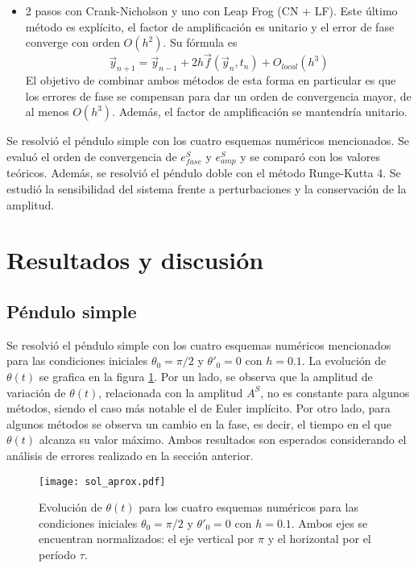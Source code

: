 \documentclass[aps,prb,twocolumn,superscriptaddress,floatfix,longbibliography,10pt]{revtex4-2}
\newif\ifptitle
\newif\ifpnumber
\newcounter{para}
\newcommand\ptitle[1]{\par\refstepcounter{para}
{\ifpnumber{\noindent\textcolor{lightgray}{\textbf{\thepara}}\indent}\fi}
{\ifptitle{\textbf{[{#1}]}}\fi}}
\begin{document}
\begin{itemize}
  \item 2 pasos con Crank-Nicholson y uno con Leap Frog (CN + LF). Este último método es explícito, el factor de amplificación es unitario y el error de fase converge con orden $O(h^2)$. Su fórmula es
  \begin{equation}
    \nonumber \vec{y}_{n+1} = \vec{y}_{n-1} + 2 h \vec{f}(\vec{y}_n, t_n) + O_{local}(h^3)
    \label{eq:Leap_Frog}
  \end{equation}
  El objetivo de combinar ambos métodos de esta forma en particular es que los errores de fase se compensan para dar un orden de convergencia mayor, de al menos $O(h^3)$. Además, el factor de amplificación se mantendría unitario.


\end{itemize}

\ptitle{Resumen de lo que se hará. Qué se resuelve con qué}
Se resolvió el péndulo simple con los cuatro esquemas numéricos mencionados. Se evaluó el orden de convergencia de $e^S_{fase}$ y $e^S_{amp}$ y se comparó con los valores teóricos. Además, se resolvió el péndulo doble con el método Runge-Kutta 4. Se estudió la sensibilidad del sistema frente a perturbaciones y la conservación de la amplitud.





\section{Resultados y discusión}

\subsection{Péndulo simple}

Se resolvió el péndulo simple con los cuatro esquemas numéricos mencionados para las condiciones iniciales $\theta_0 = \pi/2$ y $\theta'_0 = 0$ con $h = 0.1$. La evolución de $\theta(t)$ se grafica en la figura \ref{fig:sol_aprox}. Por un lado, se observa que la amplitud de variación de $\theta(t)$, relacionada con la amplitud $A^S$, no es constante para algunos métodos, siendo el caso más notable el de Euler implícito. Por otro lado, para algunos métodos se observa un cambio en la fase, es decir, el tiempo en el que $\theta(t)$ alcanza su valor máximo. Ambos resultados son esperados considerando el análisis de errores realizado en la sección anterior.


\begin{figure}[h]
  \texttt{[image: sol\_aprox.pdf]}
  \caption{Evolución de $\theta(t)$ para los cuatro esquemas numéricos para las condiciones iniciales $\theta_0 = \pi/2$ y $\theta'_0 = 0$ con $h = 0.1$. Ambos ejes se encuentran normalizados: el eje vertical por $\pi$ y el horizontal por el período $\tau$.}
   \label{fig:sol_aprox}
\end{figure}
\end{document}
